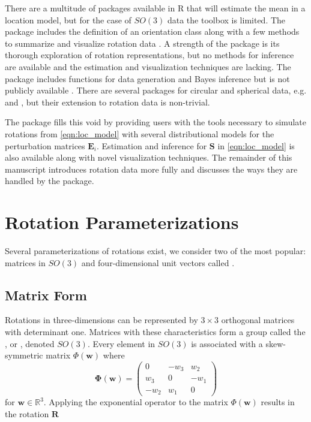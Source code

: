 There are a multitude of packages available in R that will estimate the mean in a location model, but for the case of $SO(3)$ data the toolbox is limited.  The  package includes the definition of an orientation class along with a few methods to summarize and visualize rotation data \citep{murdoch2003}.  A strength of the  package is its thorough exploration of rotation representations, but no methods for inference are available and the estimation and visualization techniques are lacking.  The  package includes functions for data generation and Bayes inference but is not publicly available \citet{qu2013}.  There are several packages for circular and spherical data, e.g.  and , but their extension to rotation data is non-trivial.

The  package fills this void by providing users with the tools necessary to simulate rotations from \eqref{eqn:loc_model} with several distributional models for the perturbation matrices $\bm E_i$.  Estimation and inference for $\bm{S}$ in \eqref{eqn:loc_model} is also available along with novel visualization techniques.  The remainder of this manuscript introduces rotation data more fully and discusses the ways they are handled by the  package.


\section{Rotation Parameterizations}

Several parameterizations of rotations exist, we consider two of the most popular: matrices in $SO(3)$ and four-dimensional unit vectors called .  

\subsection{Matrix Form}

Rotations in three-dimensions can be represented by $3\times3$ orthogonal matrices with determinant one.  Matrices with these characteristics form a group called the , or , denoted $SO(3)$.  Every element in $SO(3)$ is associated with a skew-symmetric matrix $\Phi(\bm w)$ where
\[
\bm{\Phi}(\bm{w}) = \left(\begin{array}{ccc}0 & -w_3 & w_2 \\ w_3 & 0 & -w_1 \\-w_2 & w_1 & 0\end{array}\right)
\]
for $\bm w\in\mathbb{R}^3$.  Applying the exponential operator to the matrix $\Phi(\bm w)$ results in the rotation $\bm R$

